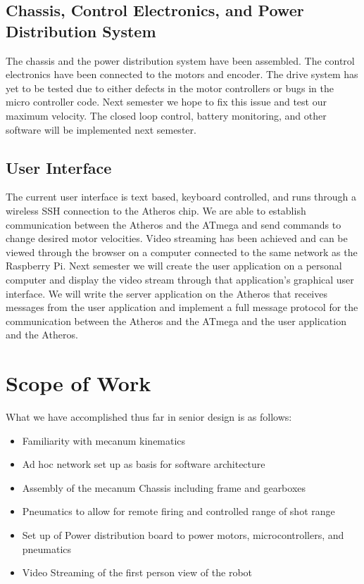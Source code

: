 \documentclass[letterpaper,12pt]{article}
\begin{document}
\subsection{Chassis, Control Electronics, and Power Distribution System}
\noindent The chassis and the power distribution system have been assembled. The control electronics have been connected to the motors and encoder. The drive system has yet to be tested due to either defects in the motor controllers or bugs in the micro controller code. Next semester we hope to fix this issue and test our maximum velocity. The closed loop control, battery monitoring, and other software will be implemented next semester.\\

\subsection{User Interface}
\noindent The current user interface is text based, keyboard controlled, and runs through a wireless SSH connection to the Atheros chip. We are able to establish communication between the Atheros and the ATmega and send commands to change desired motor velocities. Video streaming has been achieved and can be viewed through the browser on a computer connected to the same network as the Raspberry Pi. Next semester we will create the user application on a personal computer and display the video stream through that application’s graphical user interface. We will write the server application on the Atheros that receives messages from the user application and implement a full message protocol for the communication between the Atheros and the ATmega and the user application and the Atheros. \\

\section{Scope of Work}
\noindent What we have accomplished thus far in senior design is as follows: 
\begin{itemize}
    \item Familiarity with mecanum kinematics
    \item Ad hoc network set up as basis for software architecture
    \item Assembly of the mecanum Chassis including frame and gearboxes
    \item Pneumatics to allow for remote firing and controlled range of shot range
    \item Set up of Power distribution board to power motors, microcontrollers, and pneumatics
    \item Video Streaming of the first person view of the robot
\end{itemize}
\end{document}
